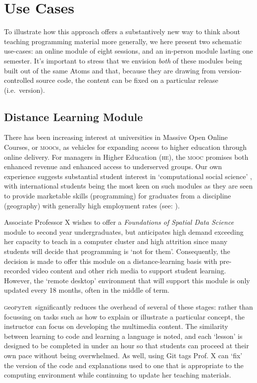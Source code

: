 \documentclass[letter, 11pt,titlepage]{article}
\newcommand{\gp}{\textsc{g}eo\textsc{p}y\textsc{t}e\textsc{r}~\/}
\newcommand{\ie}{i.e.~\/}
\begin{document}
\section{Use Cases}\label{uses}

To illustrate how this approach offers a substantively new way to think about teaching programming material more generally, we here present two schematic use-cases: an online module of eight sessions, and an in-person module lasting one semester. It's important to stress that we envision \emph{both} of these modules being built out of the same Atoms and that, because they are drawing from version-controlled source code, the content can be fixed on a particular release (\ie version).

\subsection{Distance Learning Module}\label{an-online-module}

There has been increasing interest at universities in Massive Open Online Courses, or \textsc{mooc}s, as vehicles for expanding access to higher education through online delivery. For managers in Higher Education (\textsc{he}), the \textsc{mooc} promises both enhanced revenue and enhanced access to underserved groups. Our own experience suggests substantial student interest in `computational social science' \citep{Lazer2009}, with international students being the most keen on such modules as they are seen to provide marketable skills (programming) for graduates from a discipline (geography) with generally high employment rates (see: \citeauthor{rgs2017} \citeyear{rgs2017}).

Associate Professor X wishes to offer a \emph{Foundations of Spatial Data Science} module to second year undergraduates, but anticipates high demand exceeding her capacity to teach in  a computer cluster and high attrition since many students will decide that programming is `not for them'. Consequently, the decision is made to offer this module on a distance-learning basis with pre-recorded video content and other rich media to support student learning. However, the `remote desktop' environment that will support this module is only updated every 18 months, often in the middle of term.

\gp significantly reduces the overhead of several of these stages: rather than focussing on tasks such as how to explain or illustrate a particular concept, the instructor can focus on developing the multimedia content. The similarity between learning to code and learning a language is noted, and each `lesson' is designed to be completed in under an hour so that students can proceed at their own pace without being overwhelmed. As well, using Git tags Prof. X can `fix' the version of the code and explanations used to one that is appropriate to the computing environment while continuing to update her teaching materials.
\end{document}
